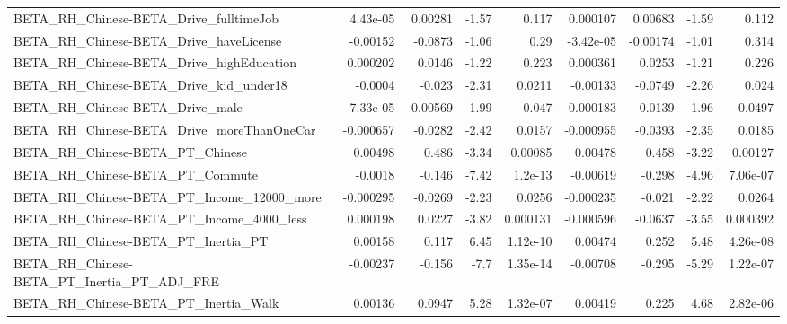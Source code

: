 \begin{tabular}{lrrrrrrrr}
BETA\_RH\_Chinese-BETA\_Drive\_fulltimeJob             &    4.43e-05 &      0.00281 &    -1.57 &    0.117 &   0.000107 &     0.00683 &        -1.59 &         0.112 \\
BETA\_RH\_Chinese-BETA\_Drive\_haveLicense             &    -0.00152 &      -0.0873 &    -1.06 &     0.29 &  -3.42e-05 &    -0.00174 &        -1.01 &         0.314 \\
BETA\_RH\_Chinese-BETA\_Drive\_highEducation           &    0.000202 &       0.0146 &    -1.22 &    0.223 &   0.000361 &      0.0253 &        -1.21 &         0.226 \\
BETA\_RH\_Chinese-BETA\_Drive\_kid\_under18             &     -0.0004 &       -0.023 &    -2.31 &   0.0211 &   -0.00133 &     -0.0749 &        -2.26 &         0.024 \\
BETA\_RH\_Chinese-BETA\_Drive\_male                    &   -7.33e-05 &     -0.00569 &    -1.99 &    0.047 &  -0.000183 &     -0.0139 &        -1.96 &        0.0497 \\
BETA\_RH\_Chinese-BETA\_Drive\_moreThanOneCar          &   -0.000657 &      -0.0282 &    -2.42 &   0.0157 &  -0.000955 &     -0.0393 &        -2.35 &        0.0185 \\
BETA\_RH\_Chinese-BETA\_PT\_Chinese                    &     0.00498 &        0.486 &    -3.34 &  0.00085 &    0.00478 &       0.458 &        -3.22 &       0.00127 \\
BETA\_RH\_Chinese-BETA\_PT\_Commute                    &     -0.0018 &       -0.146 &    -7.42 &  1.2e-13 &   -0.00619 &      -0.298 &        -4.96 &      7.06e-07 \\
BETA\_RH\_Chinese-BETA\_PT\_Income\_12000\_more          &   -0.000295 &      -0.0269 &    -2.23 &   0.0256 &  -0.000235 &      -0.021 &        -2.22 &        0.0264 \\
BETA\_RH\_Chinese-BETA\_PT\_Income\_4000\_less           &    0.000198 &       0.0227 &    -3.82 & 0.000131 &  -0.000596 &     -0.0637 &        -3.55 &      0.000392 \\
BETA\_RH\_Chinese-BETA\_PT\_Inertia\_PT                 &     0.00158 &        0.117 &     6.45 & 1.12e-10 &    0.00474 &       0.252 &         5.48 &      4.26e-08 \\
BETA\_RH\_Chinese-BETA\_PT\_Inertia\_PT\_ADJ\_FRE         &    -0.00237 &       -0.156 &     -7.7 & 1.35e-14 &   -0.00708 &      -0.295 &        -5.29 &      1.22e-07 \\
BETA\_RH\_Chinese-BETA\_PT\_Inertia\_Walk               &     0.00136 &       0.0947 &     5.28 & 1.32e-07 &    0.00419 &       0.225 &         4.68 &      2.82e-06 \\

\end{tabular}
